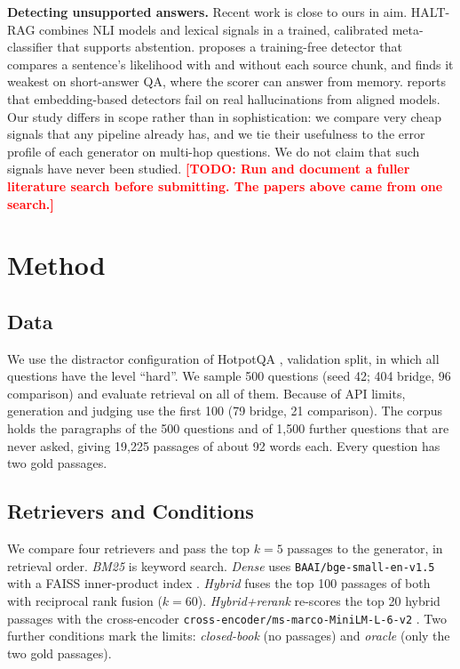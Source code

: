 \documentclass[10pt,a4paper,twocolumn]{article}
\newcommand{\todo}[1]{\textcolor{red}{\textbf{[TODO: #1]}}}
\newcommand{\model}[1]{\texttt{#1}}
\begin{document}
\textbf{Detecting unsupported answers.} Recent work is close to ours in aim. HALT-RAG
\cite{goswami2025halt} combines NLI models and lexical signals in a trained, calibrated meta-classifier that
supports abstention. \citet{bouke2026context} proposes a training-free detector that compares a sentence's
likelihood with and without each source chunk, and finds it weakest on short-answer QA, where the scorer can
answer from memory. \citet{sinha2025semantic} reports that embedding-based detectors fail on real hallucinations
from aligned models. Our study differs in scope rather than in sophistication: we compare very cheap signals
that any pipeline already has, and we tie their usefulness to the error profile of each generator on multi-hop
questions. We do not claim that such signals have never been studied.
\todo{Run and document a fuller literature search before submitting. The papers above came from one search.}

\section{Method}

\subsection{Data}
We use the distractor configuration of HotpotQA \cite{yang2018hotpotqa}, validation split, in which all questions
have the level ``hard''. We sample 500 questions (seed 42; 404 bridge, 96 comparison) and evaluate retrieval on all
of them. Because of API limits, generation and judging use the first 100 (79 bridge, 21 comparison). The corpus
holds the paragraphs of the 500 questions and of 1,500 further questions that are never asked, giving 19,225
passages of about 92 words each. Every question has two gold passages.

\subsection{Retrievers and Conditions}
We compare four retrievers and pass the top $k=5$ passages to the generator, in retrieval order. \emph{BM25}
\cite{robertson2009bm25} is keyword search. \emph{Dense} \cite{karpukhin2020dpr} uses \model{BAAI/bge-small-en-v1.5}
\cite{xiao2024cpack} with a FAISS inner-product index \cite{johnson2021faiss}. \emph{Hybrid} fuses the top 100 passages of
both with reciprocal rank fusion \cite{cormack2009rrf} ($k=60$). \emph{Hybrid+rerank} re-scores the top 20 hybrid passages
with the cross-encoder \model{cross-encoder/ms-marco-MiniLM-L-6-v2} \cite{reimers2019sbert,nogueira2019rerank}. Two
further conditions mark the limits: \emph{closed-book} (no passages) and \emph{oracle} (only the two gold passages).
\end{document}
